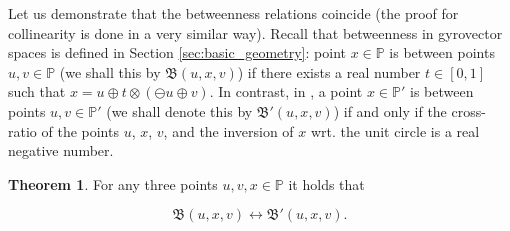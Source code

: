 \documentclass[a4paper]{article}
\theoremstyle{definition}
\newtheorem{theorem}{Theorem}[section]
\begin{document}
Let us demonstrate that the betweenness relations coincide (the proof
for collinearity is done in a very similar way). Recall that
betweenness in gyrovector spaces is defined in Section
\ref{sec:basic_geometry}: point $x \in \mathbb{P}$ is between points
$u, v \in \mathbb{P}$ (we shall this by $\mathfrak{B}(u, x, v)$) if
there exists a real number $t \in [0, 1]$ such that
$x = u \oplus t \otimes (\ominus u \oplus v)$. In contrast, in
\cite{amai-poincare}, a point $x \in \mathbb{P}'$ is between points
$u, v \in \mathbb{P}'$ (we shall denote this by
$\mathfrak{B}'(u, x, v)$) if and only if the cross-ratio of the points
$u$, $x$, $v$, and the inversion of $x$ wrt. the unit circle is a real
negative number.

\begin{theorem}
  For any three points $u, v, x \in \mathbb{P}$ it holds that

  $$\mathfrak{B}(u, x, v) \longleftrightarrow \mathfrak{B}'(u, x, v).$$  
\end{theorem}
\end{document}
